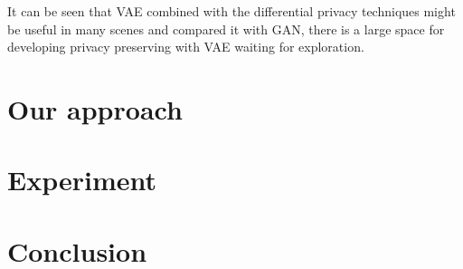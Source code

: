 \documentclass[conference]{IEEEtran}
\begin{document}
It can be seen that VAE combined with the differential privacy techniques might be useful in many scenes and compared it with GAN, there is a large space for developing privacy preserving with VAE waiting for exploration.

\section{Our approach}



\section{Experiment}

\section{Conclusion}
\end{document}

